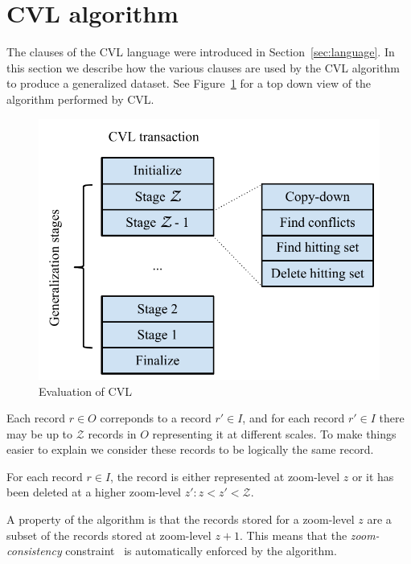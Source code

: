 \section{CVL algorithm}

The clauses of the CVL language were introduced in Section~\ref{sec:language}. In this section we describe how the various clauses are used by the CVL algorithm to produce a generalized dataset. See Figure~\ref{fig:evaluation} for a top down view of the algorithm performed by CVL.

\begin{figure}[htbp]
\begin{center}
\includegraphics[scale=.75]{figs/cvl_stages.pdf}
\caption{Evaluation of CVL}
\label{fig:evaluation}
\end{center}
\end{figure}

Each record $r \in O$ correponds to a record $r' \in I$, and for each record $r' \in I$ there may be up to $\mathcal{Z}$ records in $O$ representing it at different scales. To make things easier to explain we consider these records to be logically the same record.

For each record $r \in I$, the record is either represented at zoom-level $z$ or it has been deleted at a higher zoom-level $z': z < z' < \mathcal{Z}$.

A property of the algorithm is that the records stored for a zoom-level $z$ are a subset of the records stored at zoom-level $z+1$. This means that the \emph{zoom-consistency} constraint~\cite{fusiontables} is automatically enforced by the algorithm.

